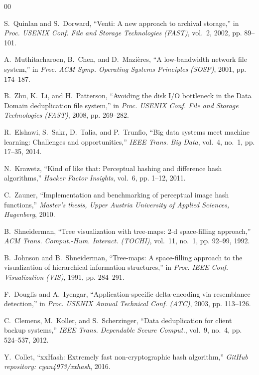 \documentclass[journal,compsoc,10pt,twocolumn]{IEEEtran}
\begin{document}
\begin{thebibliography}{00}

S.~Quinlan and S.~Dorward, ``Venti: A new approach to archival storage,'' in \emph{Proc. USENIX Conf. File and Storage Technologies (FAST)}, vol.~2, 2002, pp. 89--101.

A.~Muthitacharoen, B.~Chen, and D.~Mazi{\`e}res, ``A low-bandwidth network file system,'' in \emph{Proc. ACM Symp. Operating Systems Principles (SOSP)}, 2001, pp. 174--187.

B.~Zhu, K.~Li, and H.~Patterson, ``Avoiding the disk I/O bottleneck in the Data Domain deduplication file system,'' in \emph{Proc. USENIX Conf. File and Storage Technologies (FAST)}, 2008, pp. 269--282.

R.~Elshawi, S.~Sakr, D.~Talia, and P.~Trunfio, ``Big data systems meet machine learning: Challenges and opportunities,'' \emph{IEEE Trans. Big Data}, vol.~4, no.~1, pp. 17--35, 2014.

N.~Krawetz, ``Kind of like that: Perceptual hashing and difference hash algorithms,'' \emph{Hacker Factor Insights}, vol.~6, pp. 1--12, 2011.

C.~Zauner, ``Implementation and benchmarking of perceptual image hash functions,'' \emph{Master's thesis, Upper Austria University of Applied Sciences, Hagenberg}, 2010.

B.~Shneiderman, ``Tree visualization with tree-maps: 2-d space-filling approach,'' \emph{ACM Trans. Comput.-Hum. Interact. (TOCHI)}, vol.~11, no.~1, pp. 92--99, 1992.

B.~Johnson and B.~Shneiderman, ``Tree-maps: A space-filling approach to the visualization of hierarchical information structures,'' in \emph{Proc. IEEE Conf. Visualization (VIS)}, 1991, pp. 284--291.

F.~Douglis and A.~Iyengar, ``Application-specific delta-encoding via resemblance detection,'' in \emph{Proc. USENIX Annual Technical Conf. (ATC)}, 2003, pp. 113--126.

C.~Clemens, M.~Koller, and S.~Scherzinger, ``Data deduplication for client backup systems,'' \emph{IEEE Trans. Dependable Secure Comput.}, vol.~9, no.~4, pp. 524--537, 2012.

Y.~Collet, ``xxHash: Extremely fast non-cryptographic hash algorithm,'' \emph{GitHub repository: cyan4973/xxhash}, 2016.


\end{thebibliography}
\end{document}
